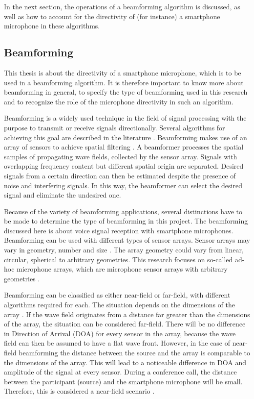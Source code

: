 In the next section, the operations of a beamforming algorithm is discussed, as well as how to account for the directivity of (for instance) a smartphone microphone in these algorithms.

\subsection{Beamforming}
\label{ssec:background-beamforming}
This thesis is about the directivity of a smartphone microphone, which is to be used in a beamforming algorithm.
It is therefore important to know more about beamforming in general, to specify the type of beamforming used in this research and to recognize the role of the microphone directivity in such an algorithm.  


Beamforming is a widely used technique in the field of signal processing with the purpose to transmit or receive signals directionally.
Several algorithms for achieving this goal are described in the literature \cite{mucci1984comparison}.
Beamforming makes use of an array of sensors to achieve spatial filtering \cite{VanVeen19884}.
A beamformer processes the spatial samples of propagating wave fields, collected by the sensor array.
Signals with overlapping frequency content but different spatial origin are separated.
Desired signals from a certain direction can then be estimated despite the presence of noise and interfering signals. 
In this way, the beamformer can select the desired signal and eliminate the undesired one. 

Because of the variety of beamforming applications, several distinctions have to be made to determine the type of beamforming in this project.
The beamforming discussed here is about voice signal reception with smartphone microphones.
Beamforming can be used with different types of sensor arrays. Sensor arrays may vary in geometry, number and size \cite{VanVeen19884}.
The array geometry could vary from linear, circular, spherical to arbitrary geometries.
This research focuses on so-called ad-hoc microphone arrays, which are microphone sensor arrays with arbitrary geometries \cite{BAP:ErikNiels}. 

Beamforming can be classified as either near-field or far-field, with different algorithms required for each. The situation depends on the dimensions of the array \cite{ryan1997near}.
If the wave field originates from a distance far greater than the dimensions of the array, the situation can be considered far-field.
There will be no difference in Direction of Arrival (DOA) for every sensor in the array, because the wave field can then be assumed to have a flat wave front.
However, in the case of near-field beamforming the distance between the source and the array is comparable to the dimensions of the array.
This will lead to a noticeable difference in DOA and amplitude of the signal at every sensor.  
During a conference call, the distance between the participant (source) and the smartphone microphone will be small. Therefore, this is considered a near-field scenario \cite{BAP:ErikNiels}. 

